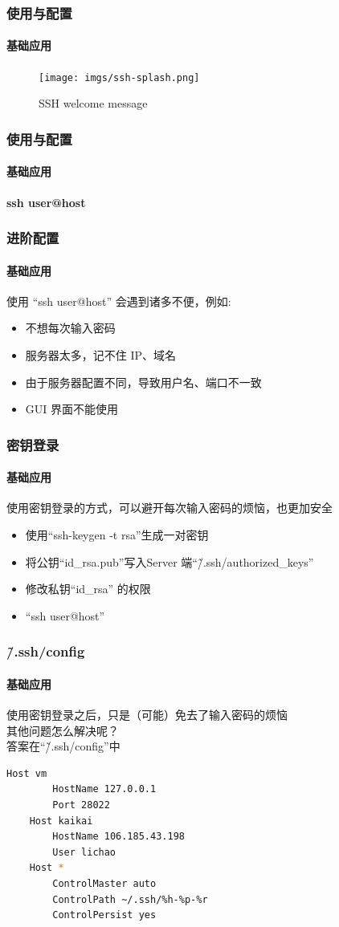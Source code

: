 \begin{frame}[fragile]
  \frametitle{使用与配置}
  \framesubtitle{基础应用}
  \begin{figure}[htbp]
    \centering
    \texttt{[image: imgs/ssh-splash.png]}
    \caption{SSH welcome message}
    \label{fig:ssh-splash}
  \end{figure}
\end{frame}


\begin{frame}[fragile]
  \frametitle{使用与配置}
  \framesubtitle{基础应用}

  \textbf{ssh user@host}

\end{frame}

\begin{frame}[fragile]
  \frametitle{进阶配置}
  \framesubtitle{基础应用}
  使用 ``ssh user@host'' 会遇到诸多不便，例如:
  \begin{itemize}
  \item 不想每次输入密码
  \item 服务器太多，记不住 IP、域名
  \item 由于服务器配置不同，导致用户名、端口不一致
  \item GUI 界面不能使用
  \end{itemize}
\end{frame}

\begin{frame}[fragile]
  \frametitle{密钥登录}
  \framesubtitle{基础应用}
  使用密钥登录的方式，可以避开每次输入密码的烦恼，也更加安全
  \begin{itemize}
  \item 使用``ssh-keygen -t rsa''生成一对密钥
  \item 将公钥``id\_rsa.pub''写入Server 端``\~/.ssh/authorized\_keys''
  \item 修改私钥``id\_rsa'' 的权限
  \item ``ssh user@host''
  \end{itemize}
\end{frame}

\begin{frame}[fragile]
  \frametitle{\~/.ssh/config}
  \framesubtitle{基础应用}
  使用密钥登录之后，只是（可能）免去了输入密码的烦恼 \\
  其他问题怎么解决呢？ \\
  \vspace{\baselineskip}
  \pause
  答案在``\~/.ssh/config''中
  \begin{lstlisting}[language=bash]
    Host vm
        HostName 127.0.0.1
        Port 28022
    Host kaikai
        HostName 106.185.43.198
        User lichao
    Host *
        ControlMaster auto
        ControlPath ~/.ssh/%h-%p-%r
        ControlPersist yes
  \end{lstlisting}
\end{frame}

